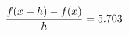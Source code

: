 \documentclass[preview]{standalone}
\begin{document}
\begin{align*}
\special{dvisvgm:raw <g id='unique000'>}\frac{f(x+h)-f(x)}{h} = 5.703\special{dvisvgm:raw </g>}
\end{align*}
\end{document}

